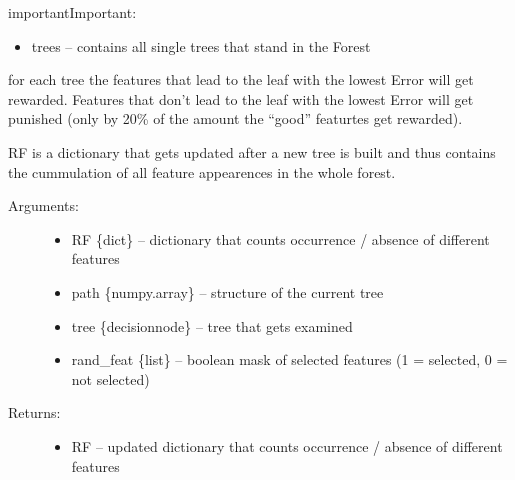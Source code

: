 \documentclass[letterpaper,10pt,english]{sphinxmanual}
\begin{document}
\begin{sphinxadmonition}{important}{Important:}
\begin{fulllineitems}
\begin{description}
\begin{itemize}
\item {} 
trees -- contains all single trees that stand in the Forest

\end{itemize}

\end{description}

\end{fulllineitems}

\label{\detokenize{RF:update-rf}}

\begin{fulllineitems}
\label{\detokenize{RF:ForestFire.Main.update_RF}}
for each tree the features that lead to the leaf with the lowest Error will get rewarded.
Features that don't lead to the leaf with the lowest Error will get punished (only by 20\% of
the amount the ``good'' featurtes get rewarded).

RF is a dictionary that gets updated after a new tree is built and thus contains the cummulation of all
feature appearences in the whole forest.
\begin{description}
\item[{Arguments:}] \leavevmode\begin{itemize}
\item {} 
RF \{dict\} -- dictionary that counts occurrence / absence of different features

\item {} 
path \{numpy.array\} -- structure of the current tree

\item {} 
tree \{decisionnode\} -- tree that gets examined

\item {} 
rand\_feat \{list\} -- boolean mask of selected features (1 = selected, 0 = not selected)

\end{itemize}

\item[{Returns:}] \leavevmode\begin{itemize}
\item {} 
RF -- updated dictionary that counts occurrence / absence of different features

\end{itemize}

\end{description}


\end{fulllineitems}
\end{sphinxadmonition}
\end{document}
